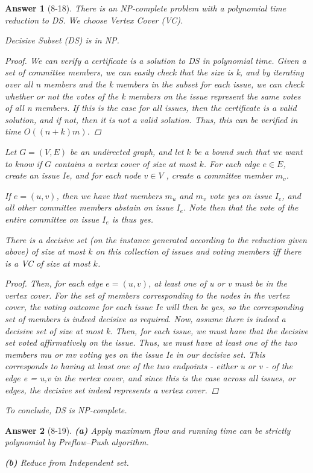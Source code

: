 \documentclass[11pt]{article}
\theoremstyle{numberplain}
\theoremstyle{nonumberplain}
\newtheorem{proof}{Proof}
\newtheorem{ans}{Answer}
\newcommand{\0}{{\mathbf{0}}}
\begin{document}
\begin{ans}[8-18] There is an NP-complete problem with a polynomial time reduction to DS. We choose Vertex Cover (VC). 
\begin{State}[Claim 1]
Decisive Subset (DS) is in NP.
\end{State} 
\begin{proof}
We can verify a certificate is a solution to DS in polynomial time. Given a set of committee members, we can easily check that the size is k, and by iterating over all n members and the k members in the subset for each issue, we can check whether or not the votes of the k members on the issue represent the same votes of all n members. If this is the case for all issues, then the certificate is a valid solution, and if not, then it is not a valid solution. Thus, this can be verified in time $O((n + k)m)$. 
\end{proof}
Let $G = (V,E)$ be an undirected graph, and let $k$ be a bound such that we want to know if $G$ contains a vertex cover of size at most $k$. For each edge $e \in E$, create an issue Ie, and for each node $v \in V$ , create a committee member $m_v$.


If $e = (u,v)$, then we have that members $m_u$ and $m_v$ vote yes on issue $I_e$, and all other committee members abstain on issue $I_e$. Note then that the vote of the entire committee on issue $I_e$ is thus yes. 
\begin{State}[Claim 2]
 There is a decisive set (on the instance generated according to the reduction given above) of size at most $k$ on this collection of issues and voting members iff there is a VC of size at most $k$.
 \end{State}
 \begin{proof}
Then, for each edge $e = (u,v)$, at least one of u or v must be in the vertex cover. For the set of members corresponding to the nodes in the vertex cover, the voting outcome for each issue Ie will then be yes, so the corresponding set of members is indeed decisive as required. Now, assume there is indeed a decisive set of size at most k. Then, for each issue, we must have that the decisive set voted aﬃrmatively on the issue. Thus, we must have at least one of the two members mu or mv voting yes on the issue Ie in our decisive set. This corresponds to having at least one of the two endpoints - either u or v - of the edge e = {u,v} in the vertex cover, and since this is the case across all issues, or edges, the decisive set indeed represents a vertex cover.
\end{proof}
To conclude, DS is NP-complete.
\end{ans}
\begin{ans}[8-19]  \textbf{(a)} Apply maximum flow and running time can be strictly polynomial by Preflow--Push algorithm.

\textbf{(b)} Reduce from Independent set.
\end{ans}
\end{document}
